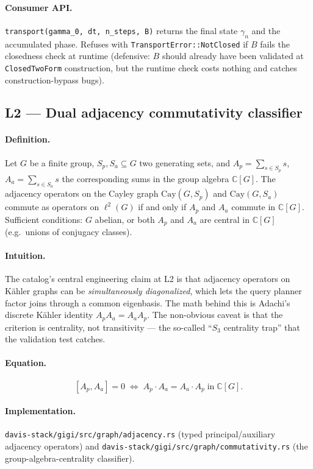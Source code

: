 \documentclass[11pt,letterpaper]{article}
\begin{document}
\paragraph{Consumer API.}
\verb|transport(gamma_0, dt, n_steps, B)| returns the final state
$\gamma_n$ and the accumulated phase. Refuses with
\verb|TransportError::NotClosed| if $B$ fails the closedness check
at runtime (defensive: $B$ should already have been validated at
\texttt{ClosedTwoForm} construction, but the runtime check costs
nothing and catches construction-bypass bugs).


\subsection{L2 --- Dual adjacency commutativity classifier}

\paragraph{Definition.}
Let $G$ be a finite group, $S_p, S_a \subseteq G$ two generating
sets, and $A_p = \sum_{s \in S_p} s$, $A_a = \sum_{s \in S_a} s$
the corresponding sums in the group algebra $\mathbb{C}[G]$. The
adjacency operators on the Cayley graph $\mathrm{Cay}(G, S_p)$ and
$\mathrm{Cay}(G, S_a)$ commute as operators on $\ell^2(G)$ if and
only if $A_p$ and $A_a$ commute in $\mathbb{C}[G]$. Sufficient
conditions: $G$ abelian, or both $A_p$ and $A_a$ are central in
$\mathbb{C}[G]$ (e.g.\ unions of conjugacy classes).

\paragraph{Intuition.}
The catalog's central engineering claim at L2 is that adjacency
operators on K\"ahler graphs can be \emph{simultaneously
diagonalized}, which lets the query planner factor joins through a
common eigenbasis. The math behind this is Adachi's discrete
K\"ahler identity $A_p A_a = A_a A_p$. The non-obvious caveat is
that the criterion is centrality, not transitivity --- the so-called
``$S_3$ centrality trap'' that the validation test catches.

\paragraph{Equation.}
\[
[A_p, A_a] = 0 \;\Longleftrightarrow\;
A_p \cdot A_a = A_a \cdot A_p \;\text{in}\; \mathbb{C}[G].
\]

\paragraph{Implementation.}
\texttt{davis-stack/gigi/src/graph/adjacency.rs} (typed
principal/auxiliary adjacency operators) and
\texttt{davis-stack/gigi/src/graph/commutativity.rs} (the
group-algebra-centrality classifier).
\end{document}
